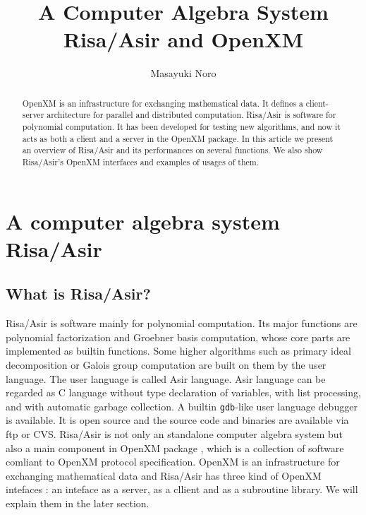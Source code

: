 \documentclass[runningheads]{cl2emult}
\begin{document}
%
\title*{A Computer Algebra System Risa/Asir and OpenXM}
%
%
%
%
%
\author{Masayuki Noro}
%
%
%

\maketitle              %

\begin{abstract}
OpenXM \cite{OPENXM} is an infrastructure for exchanging mathematical
data.  It defines a client-server architecture for parallel and
distributed computation.  Risa/Asir is software for polynomial
computation. It has been developed for testing new algorithms, and now
it acts as both a client and a server in the OpenXM package. In this
article we present an overview of Risa/Asir and its performances on
several functions.  We also show Risa/Asir's OpenXM interfaces and
examples of usages of them.
\end{abstract}

\section{A computer algebra system Risa/Asir}

\subsection{What is Risa/Asir?}

Risa/Asir \cite{RISA} is software mainly for polynomial
computation. Its major functions are polynomial factorization and
Groebner basis computation, whose core parts are implemented as
builtin functions.  Some higher algorithms such as primary ideal
decomposition or Galois group computation are built on them by the
user language.  The user language is called Asir language. Asir
language can be regarded as C language without type declaration of
variables, with list processing, and with automatic garbage
collection. A builtin {\tt gdb}-like user language debugger is
available. It is open source and the source code and binaries are
available via ftp or CVS.
Risa/Asir is not only an standalone computer algebra system but also a
main component in OpenXM package \cite{OPENXM}, which is a collection
of software comliant to OpenXM protocol specification.  OpenXM is an
infrastructure for exchanging mathematical data and Risa/Asir has
three kind of OpenXM intefaces : an inteface as a server, as a cllient
and as a subroutine library. We will explain them in the later
section.
\end{document}
